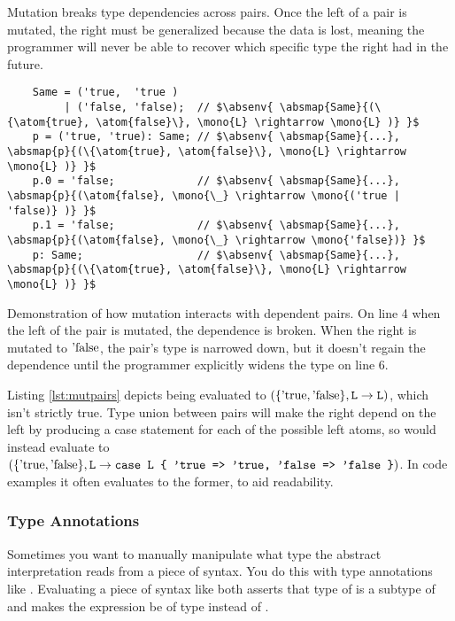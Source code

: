 \documentclass[12pt,twoside]{report}
\begin{document}
Mutation breaks type dependencies across pairs. Once the left of a pair is mutated, the right must be generalized because the data is lost, meaning the programmer will never be able to recover which specific type the right had in the future.

\begin{listing}[H]
  \begin{verbatim}
    Same = ('true,  'true )
         | ('false, 'false);  // $\absenv{ \absmap{Same}{(\{\atom{true}, \atom{false}\}, \mono{L} \rightarrow \mono{L} )} }$
    p = ('true, 'true): Same; // $\absenv{ \absmap{Same}{...}, \absmap{p}{(\{\atom{true}, \atom{false}\}, \mono{L} \rightarrow \mono{L} )} }$
    p.0 = 'false;             // $\absenv{ \absmap{Same}{...}, \absmap{p}{(\atom{false}, \mono{\_} \rightarrow \mono{('true | 'false)} )} }$
    p.1 = 'false;             // $\absenv{ \absmap{Same}{...}, \absmap{p}{(\atom{false}, \mono{\_} \rightarrow \mono{'false})} }$
    p: Same;                  // $\absenv{ \absmap{Same}{...}, \absmap{p}{(\{\atom{true}, \atom{false}\}, \mono{L} \rightarrow \mono{L} )} }$
  \end{verbatim}
  \caption{Demonstration of how mutation interacts with dependent pairs. On line 4 when the left of the pair is mutated, the dependence is broken. When the right is mutated to $\atom{false}$, the pair's type is narrowed down, but it doesn't regain the dependence until the programmer explicitly widens the type on line 6.}
  \label{lst:mutpairs}
\end{listing}

Listing \ref{lst:mutpairs} depicts  being evaluated to $(\{\text{'true}, \text{'false}\}, \text{\texttt{L}} \rightarrow \text{\texttt{L}})$, which isn't strictly true. Type union between pairs will make the right depend on the left by producing a case statement for each of the possible left atoms, so  would instead evaluate to $(\{\text{'true}, \text{'false}\}, \text{\texttt{L}} \rightarrow \text{\texttt{case L \{ 'true => 'true, 'false => 'false \}}})$. In code examples it often evaluates to the former, to aid readability.

\subsubsection{Type Annotations}
Sometimes you want to manually manipulate what type the abstract interpretation reads from a piece of syntax. You do this with type annotations like . Evaluating a piece of syntax like  both asserts that type of  is a subtype of  and makes the expression be of type  instead of .
\end{document}
